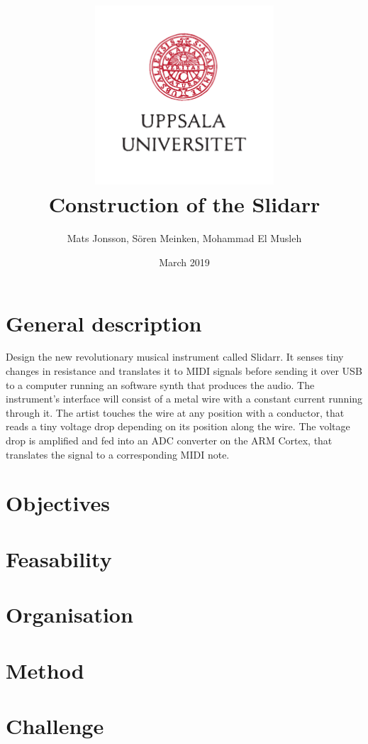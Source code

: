 \documentclass{article}
\title{\includegraphics[width=0.5\textwidth]{UU_logo.pdf}\\
Construction of the Slidarr}
\author{Mats Jonsson, Sören Meinken, Mohammad El Musleh}
\date{March 2019}
\begin{document}
\maketitle

\section{General description}
Design the new revolutionary musical instrument called Slidarr. It senses tiny changes in resistance and translates it to MIDI signals before sending it over USB to a computer running an software synth that produces the audio. The instrument's interface will consist of a metal wire with a constant current running through it. The artist touches the wire at any position with a conductor, that reads a tiny voltage drop depending on its position along the wire. The voltage drop is amplified and fed into an ADC converter on the ARM Cortex, that translates the signal to a corresponding MIDI note.

\section{Objectives}

\section{Feasability}

\section{Organisation}

\section{Method}

\section{Challenge}
\end{document}
